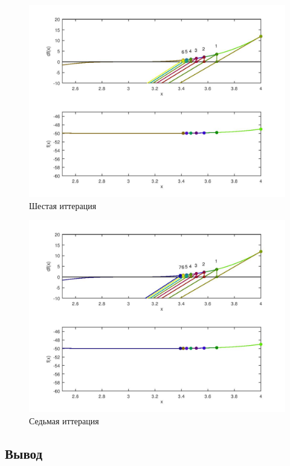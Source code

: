 \documentclass[a4paper,12pt]{article}
\begin{document}
    \begin{figure}[H]
        \centering
        \includegraphics[scale=0.4]{6secantitter.jpg}
        \caption{Шестая иттерация}
    \end{figure}
    \begin{figure}[H]
        \centering
        \includegraphics[scale=0.4]{7secantitter.jpg}
        \caption{Седьмая иттерация}
    \end{figure}
\newpage
\subsection*{Вывод}

\end{document}
